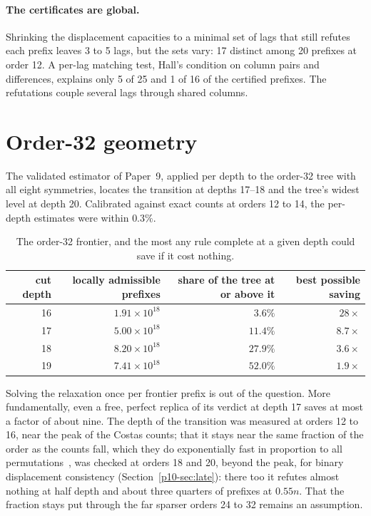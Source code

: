 \documentclass[11pt,a4paper,oneside]{report}
\theoremstyle{definition}
\begin{document}
\paragraph{The certificates are global.} Shrinking the displacement capacities to a minimal set of lags that
still refutes each prefix leaves 3 to 5 lags, but the sets vary: 17 distinct among 20 prefixes at order 12.
A per-lag matching test, Hall's condition on column pairs and differences, explains only 5 of 25 and 1 of 16
of the certified prefixes. The refutations couple several lags through shared columns.

\section{Order-32 geometry}
\label{p10-sec:geometry}
The validated estimator of Paper~9, applied per depth to the order-32 tree with all eight symmetries,
locates the transition at depths 17--18 and the tree's widest level at depth 20. Calibrated against exact
counts at orders 12 to 14, the per-depth estimates were within $0.3\%$.

\begin{table}[H]
\centering
\small
\begin{tabular}{@{}rrrr@{}}
\toprule
cut depth & locally admissible prefixes & share of the tree at or above it & best possible saving \\
\midrule
16 & $1.91\times10^{18}$ & $3.6\%$ & $28\times$ \\
17 & $5.00\times10^{18}$ & $11.4\%$ & $8.7\times$ \\
18 & $8.20\times10^{18}$ & $27.9\%$ & $3.6\times$ \\
19 & $7.41\times10^{18}$ & $52.0\%$ & $1.9\times$ \\
\bottomrule
\end{tabular}
\caption{The order-32 frontier, and the most any rule complete at a given depth could save if it cost
nothing.}
\label{p10-tab:frontier}
\end{table}

\noindent Solving the relaxation once per frontier prefix is out of the question. More fundamentally, even a
free, perfect replica of its verdict at depth 17 saves at most a factor of about nine. The depth of the transition was measured at orders 12 to 16, near the
peak of the Costas counts; that it stays near the same fraction of the order as the counts fall, which
they do exponentially fast in proportion to all permutations~\cite{p10-warnke2023density}, was checked at orders
18 and 20, beyond the peak, for binary displacement consistency (Section~\ref{p10-sec:late}): there too it
refutes almost nothing at half depth and about three quarters of prefixes at $0.55n$. That the fraction
stays put through the far sparser orders 24 to 32 remains an assumption.
\end{document}
